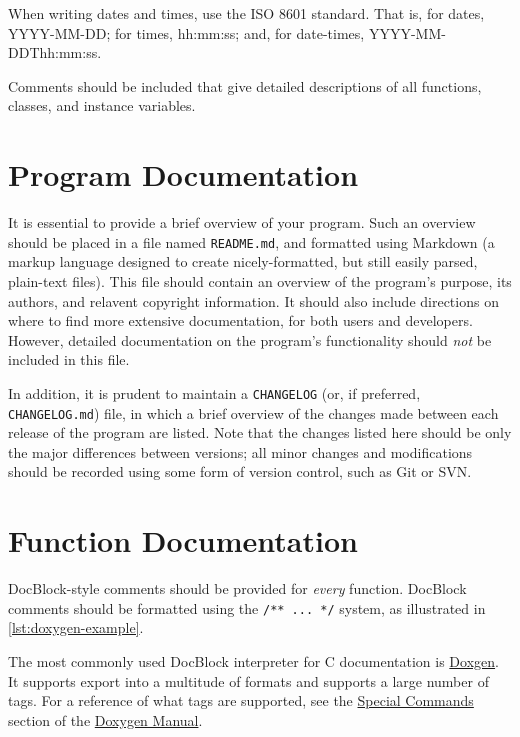 \documentclass[11pt]{book}
\begin{document}
When writing dates and times, use the ISO 8601 standard. That is, for
dates, YYYY-MM-DD; for times, hh:mm:ss; and, for date-times,
YYYY-MM-DDThh:mm:ss.

Comments should be included that give detailed descriptions of all
functions, classes, and instance variables.

\section{Program Documentation}\label{program-documentation}

It is essential to provide a brief overview of your program. Such an
overview should be placed in a file named \texttt{README.md}, and
formatted using Markdown (a markup language designed to create
nicely-formatted, but still easily parsed, plain-text files). This file
should contain an overview of the program's purpose, its authors, and
relavent copyright information. It should also include directions on
where to find more extensive documentation, for both users and
developers. However, detailed documentation on the program's
functionality should \emph{not} be included in this file.

In addition, it is prudent to maintain a \texttt{CHANGELOG} (or, if
preferred, \texttt{CHANGELOG.md}) file, in which a brief overview of the
changes made between each release of the program are listed. Note that
the changes listed here should be only the major differences between
versions; all minor changes and modifications should be recorded using
some form of version control, such as Git or SVN.

\section{Function Documentation}\label{function-documentation}

DocBlock-style comments should be provided for \emph{every} function.
DocBlock comments should be formatted using the \texttt{/**\ ...\ */}
system, as illustrated in \autoref{lst:doxygen-example}.

The most commonly used DocBlock interpreter for C documentation is
\href{http://www.stack.nl/~dimitri/doxygen/}{Doxgen}. It supports export
into a multitude of formats and supports a large number of tags. For a
reference of what tags are supported, see the
\href{http://www.stack.nl/~dimitri/doxygen/manual/commands.html}{Special
Commands} section of the
\href{http://www.stack.nl/~dimitri/doxygen/manual/index.html}{Doxygen
Manual}.
\end{document}
